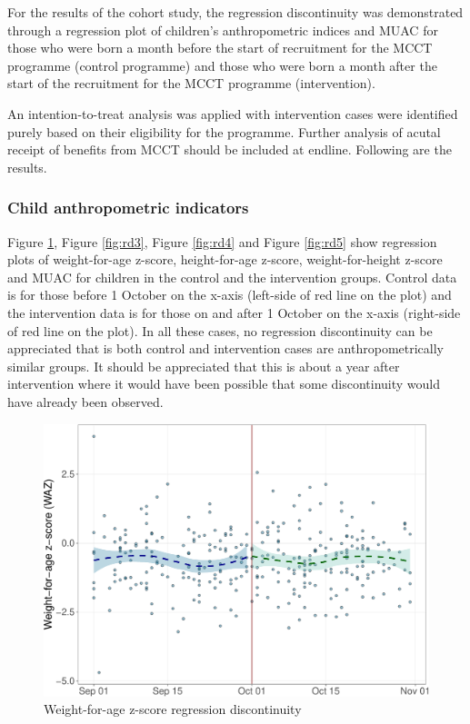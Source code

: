 \documentclass[12pt,a4paper]{article}
\begin{document}
For the results of the cohort study, the regression discontinuity was demonstrated through a regression plot of children's anthropometric indices and MUAC for those who were born a month before the start of recruitment for the MCCT programme (control programme) and those who were born a month after the start of the recruitment for the MCCT programme (intervention).

An intention-to-treat analysis was applied with intervention cases were identified purely based on their eligibility for the programme. Further analysis of acutal receipt of benefits from MCCT should be included at endline. Following are the results.

\hypertarget{child-anthropometric-indicators}{%
\subsubsection{Child anthropometric indicators}\label{child-anthropometric-indicators}}

Figure \ref{fig:rd2}, Figure \ref{fig:rd3}, Figure \ref{fig:rd4} and Figure \ref{fig:rd5} show regression plots of weight-for-age z-score, height-for-age z-score, weight-for-height z-score and MUAC for children in the control and the intervention groups. Control data is for those before 1 October on the x-axis (left-side of red line on the plot) and the intervention data is for those on and after 1 October on the x-axis (right-side of red line on the plot). In all these cases, no regression discontinuity can be appreciated that is both control and intervention cases are anthropometrically similar groups. It should be appreciated that this is about a year after intervention where it would have been possible that some discontinuity would have already been observed.

\begin{figure}[H]

{\centering \includegraphics{kayahReport_files/figure-latex/rd2-1} 

}

\caption{Weight-for-age z-score regression discontinuity}\label{fig:rd2}
\end{figure}
\end{document}
